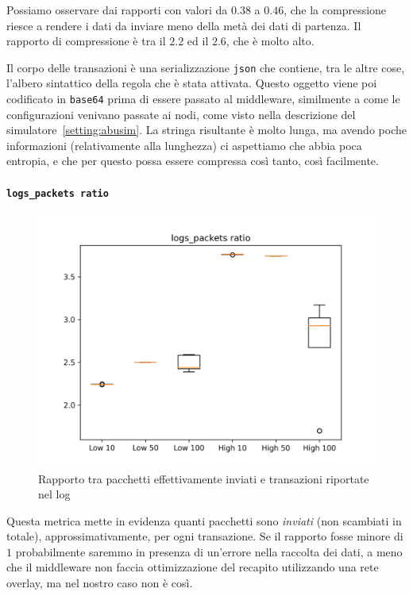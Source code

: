\documentclass[12pt, a4paper]{article}
\begin{document}
Possiamo osservare dai rapporti con valori da $0.38$ a $0.46$, che la compressione riesce a rendere i dati da inviare meno della metà dei dati di partenza.
Il rapporto di compressione è tra il $2.2$ ed il $2.6$, che è molto alto.

Il corpo delle transazioni è una serializzazione \lstinline{json} che contiene, tra le altre cose, l'albero sintattico della regola che è stata attivata. Questo oggetto viene poi codificato in \lstinline{base64} prima di essere passato al middleware, similmente a come le configurazioni venivano passate ai nodi, come visto nella descrizione del simulatore~\ref{setting:abusim}.
La stringa risultante è molto lunga, ma avendo poche informazioni (relativamente alla lunghezza) ci aspettiamo che abbia poca entropia, e che per questo possa essere compressa così tanto, così facilmente.

\paragraph{\lstinline{logs_packets ratio}}

\begin{figure}[H]
    \includegraphics[width=\linewidth, keepaspectratio]{graphs/logs_packets ratio.png}
    \caption{Rapporto tra pacchetti effettivamente inviati e transazioni riportate nel log}
    \label{fig:lpr}
\end{figure}

Questa metrica mette in evidenza quanti pacchetti sono \emph{inviati} (non scambiati in totale), approssimativamente, per ogni transazione.
Se il rapporto fosse minore di $1$ probabilmente saremmo in presenza di un'errore nella raccolta dei dati, a meno che il middleware non faccia ottimizzazione del recapito utilizzando una rete overlay, ma nel nostro caso non è così.
\end{document}
